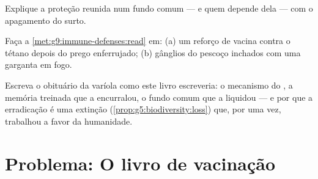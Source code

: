 \begin{exercise}[$\star\star$]\label{exo:g9:immune-defenses:10}
Explique a proteção reunida num fundo comum --- e quem
depende dela --- com o apagamento do surto.
\end{exercise}

\begin{exercise}[$\star\star$]\label{exo:g9:immune-defenses:11}
Faça a \cref{met:g9:immune-defenses:read} em: (a) um reforço
de vacina contra o tétano depois do prego enferrujado; (b)
gânglios do pescoço inchados com uma garganta em fogo.
\end{exercise}

\begin{exercise}[$\star\star\star$]\label{exo:g9:immune-defenses:12}
Escreva o obituário da varíola como este livro escreveria: o
mecanismo do , a memória treinada que a encurralou, o
fundo comum que a liquidou --- e por que a erradicação é uma
extinção (\cref{prop:g5:biodiversity:loss}) que, por uma vez,
trabalhou a favor da humanidade.
\end{exercise}

\section{Problema: O livro de vacinação}

